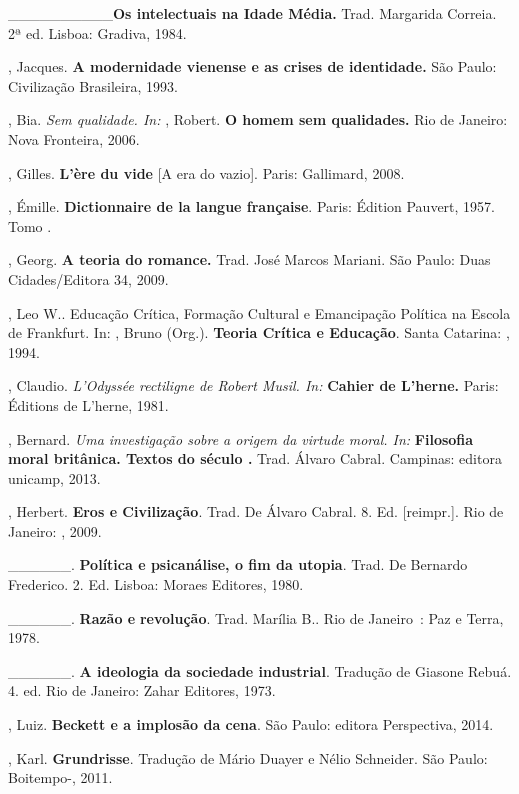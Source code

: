 \begin{Parskip}
\_\_\_\_\_\_\_\_\_\_\textbf{Os intelectuais na Idade Média.} Trad.
Margarida Correia. 2ª ed. Lisboa: Gradiva, 1984.

, Jacques. \textbf{A modernidade vienense e as crises de
identidade.} São Paulo: Civilização Brasileira, 1993.

, Bia. \emph{Sem qualidade. In:} , Robert. \textbf{O homem sem
qualidades.} Rio de Janeiro: Nova Fronteira, 2006.

, Gilles. \textbf{L'ère du vide} [A era do vazio]. Paris:
Gallimard, 2008.

, Émille. \textbf{Dictionnaire de la langue française}. Paris:
Édition Pauvert, 1957. Tomo .

, Georg. \textbf{A teoria do romance.} Trad. José Marcos Mariani.
São Paulo: Duas Cidades/Editora 34, 2009.

, Leo W.. Educação Crítica, Formação Cultural e Emancipação Política
na Escola de Frankfurt. In: , Bruno (Org.). \textbf{Teoria Crítica
e Educação}. Santa Catarina: , 1994.

, Claudio. \emph{L'Odyssée rectiligne de Robert Musil. In:}
\textbf{Cahier de L'herne.} Paris: Éditions de L'herne, 1981.

, Bernard. \emph{Uma investigação sobre a origem da virtude
moral. In:} \textbf{Filosofia moral britânica. Textos do século .}
Trad. Álvaro Cabral. Campinas: editora unicamp, 2013.

, Herbert. \textbf{Eros e Civilização}. Trad. De Álvaro Cabral.
8. Ed. [reimpr.]. Rio de Janeiro: , 2009.

\_\_\_\_\_\_. \textbf{Política e psicanálise, o fim da utopia}. Trad. De
Bernardo Frederico. 2. Ed. Lisboa: Moraes Editores, 1980.

\_\_\_\_\_\_. \textbf{Razão e} \textbf{revolução}. Trad. Marília B.. Rio
de Janeiro~: Paz e Terra, 1978.

\_\_\_\_\_\_. \textbf{A ideologia da sociedade industrial}. Tradução de
Giasone Rebuá. 4. ed. Rio de Janeiro: Zahar Editores, 1973.

, Luiz. \textbf{Beckett e a implosão da cena}. São Paulo: editora
Perspectiva, 2014.

, Karl. \textbf{Grundrisse}. Tradução de Mário Duayer e Nélio
Schneider. São Paulo: Boitempo-, 2011.


\end{Parskip}
